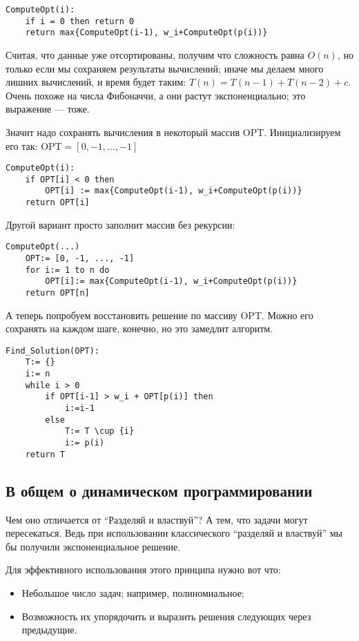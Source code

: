 \begin{lstlisting}
ComputeOpt(i):
    if i = 0 then return 0
    return max{ComputeOpt(i-1), w_i+ComputeOpt(p(i))}
\end{lstlisting}

Считая, что данные уже отсортированы, получим что сложность равна $O(n)$, но только если мы сохраняем результаты вычислений; иначе мы делаем много лишних вычислений, и время будет таким: $T(n) = T(n-1)+T(n-2)+c$. Очень похоже на числа Фибоначчи, а они растут экспоненциально; это выражение --- тоже.


Значит надо сохранять вычисления в некоторый массив OPT. Инициализируем его так: $\mathrm{OPT} = [0, -1, \ldots, -1]$
\begin{lstlisting}
ComputeOpt(i):
    if OPT[i] < 0 then
        OPT[i] := max{ComputeOpt(i-1), w_i+ComputeOpt(p(i))}
    return OPT[i]
\end{lstlisting}

Другой вариант просто заполнит массив без рекурсии:
\begin{lstlisting}
ComputeOpt(...)
    OPT:= [0, -1, ..., -1]
    for i:= 1 to n do
        OPT[i]:= max{ComputeOpt(i-1), w_i+ComputeOpt(p(i))}
    return OPT[n]
\end{lstlisting}

А теперь попробуем восстановить решение по массиву OPT. Можно его сохранять на каждом шаге, конечно, но это замедлит алгоритм.

\begin{lstlisting}
Find_Solution(OPT):
    T:= {}
    i:= n
    while i > 0
        if OPT[i-1] > w_i + OPT[p(i)] then
            i:=i-1
        else
            T:= T \cup {i}
            i:= p(i)
    return T
\end{lstlisting}

\subsection{В общем о динамическом программировании}
Чем оно отличается от ``Разделяй и властвуй''? А тем, что задачи могут пересекаться. Ведь при использовании классического ``разделяй и властвуй'' мы бы получили экспоненциальное решение. 

Для эффективного использования этого принципа нужно вот что:
\begin{itemize}
    \item Небольшое число задач; например, полиномиальное;
    \item Возможность их упорядочить и выразить решения следующих через предыдущие.
\end{itemize}

